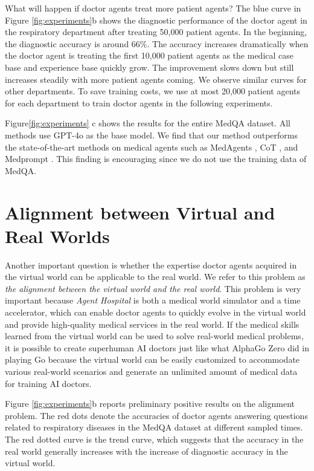 \documentclass[fleqn,12pt]{wlscirep}
\begin{document}
What will happen if doctor agents treat more patient agents? The blue curve in Figure \ref{fig:experiments}b shows the diagnostic performance of the doctor agent in the respiratory department after treating 50,000 patient agents. In the beginning, the diagnostic accuracy is around 66\%. The accuracy increases dramatically when the doctor agent is treating the first 10,000 patient agents as the medical case base and experience base quickly grow. The improvement slows down but still increases steadily with more patient agents coming. We observe similar curves for other departments. To save training costs, we use at most 20,000 patient agents for each department to train doctor agents in the following experiments.

Figure\ref{fig:experiments} c shows the results for the entire MedQA dataset. All methods use GPT-4o as the base model. We find that our method outperforms the state-of-the-art methods on medical agents such as MedAgents \cite{Tang:23:MedAgents}, CoT \cite{Wei:22:CoT}, and Medprompt \cite{Nori:23:Medprompt}. This finding is encouraging since we do not use the training data of MedQA.

\section*{Alignment between Virtual and Real Worlds}

Another important question is whether the expertise doctor agents acquired in the virtual world can be applicable to the real world. We refer to this problem as {\it the alignment between the virtual world and the real world}. This problem is very important because {\it Agent Hospital} is both a medical world simulator and a time accelerator, which can enable doctor agents to quickly evolve in the virtual world and provide high-quality medical services in the real world. If the medical skills learned from the virtual world can be used to solve real-world medical problems, it is possible to create superhuman AI doctors just like what AlphaGo Zero did in playing Go because the virtual world can be easily customized to accommodate various real-world scenarios and generate an unlimited amount of medical data for training AI doctors.

Figure \ref{fig:experiments}b reports preliminary positive results on the alignment problem. The red dots denote the accuracies of doctor agents answering questions related to respiratory diseases in the MedQA dataset at different sampled times. The red dotted curve is the trend curve, which suggests that the accuracy in the real world generally increases with the increase of  diagnostic accuracy in the virtual world.
\end{document}
